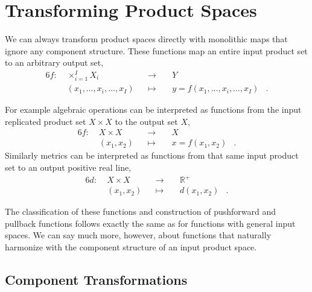 \documentclass[
  letterpaper,
  DIV=11,
  numbers=noendperiod]{scrartcl}
\begin{document}
\hypertarget{transforming-product-spaces}{%
\section{Transforming Product
Spaces}\label{transforming-product-spaces}}

We can always transform product spaces directly with monolithic maps
that ignore any component structure. These functions map an entire input
product set to an arbitrary output set, \begin{alignat*}{6}
f :\; & \times_{i = 1}^{I} X_{i} & &\rightarrow& \; & Y &
\\
& (x_{1}, \ldots, x_{i}, \ldots, x_{I}) & &\mapsto&
& y = f(x_{1}, \ldots, x_{i}, \ldots, x_{I}) &.
\end{alignat*}

For example algebraic operations can be interpreted as functions from
the input replicated product set \(X \times X\) to the output set \(X\),
\begin{alignat*}{6}
f :\; & X \times X & &\rightarrow& \; & X &
\\
& (x_{1}, x_{2}) & &\mapsto& & x = f(x_{1}, x_{2}) &.
\end{alignat*} Similarly metrics can be interpreted as functions from
that same input product set to an output positive real line,
\begin{alignat*}{6}
d :\; & X \times X & &\rightarrow& \; & \mathbb{R}^{+} &
\\
& (x_{1}, x_{2}) & &\mapsto& & d(x_{1}, x_{2}) &.
\end{alignat*}

The classification of these functions and construction of pushforward
and pullback functions follows exactly the same as for functions with
general input spaces. We can say much more, however, about functions
that naturally harmonize with the component structure of an input
product space.

\hypertarget{component-transformations}{%
\subsection{Component Transformations}\label{component-transformations}}
\end{document}
